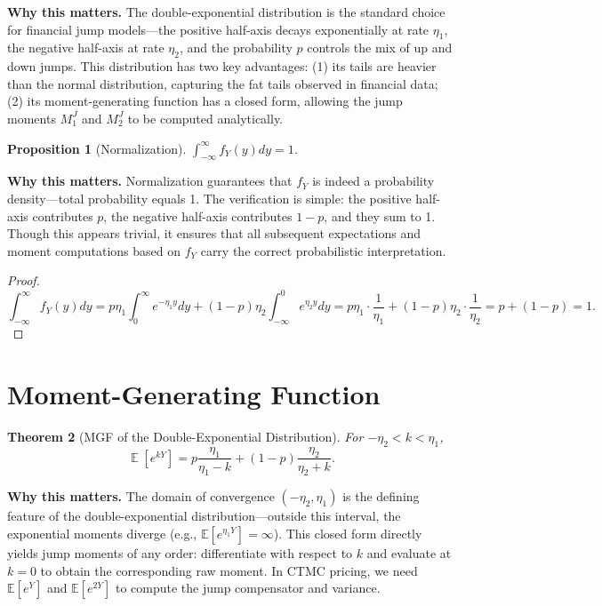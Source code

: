 \documentclass[11pt,a4paper,openany]{book}
\theoremstyle{definition}
\theoremstyle{plain}
\newtheorem{theorem}{Theorem}[chapter]
\newtheorem{proposition}[theorem]{Proposition}
\theoremstyle{remark}
\DeclareMathOperator{\E}{\mathbb{E}}
\newcommand{\1}{\mathbbm{1}}
\begin{document}
\medskip
\noindent\textbf{Why this matters.} The double-exponential distribution is the standard choice for financial jump models---the positive half-axis decays exponentially at rate $\eta_1$, the negative half-axis at rate $\eta_2$, and the probability $p$ controls the mix of up and down jumps. This distribution has two key advantages: (1) its tails are heavier than the normal distribution, capturing the fat tails observed in financial data; (2) its moment-generating function has a closed form, allowing the jump moments $M_1^J$ and $M_2^J$ to be computed analytically.

\begin{proposition}[Normalization]
$\int_{-\infty}^{\infty} f_{Y}(y) dy = 1$.
\end{proposition}

\medskip
\noindent\textbf{Why this matters.} Normalization guarantees that $f_Y$ is indeed a probability density---total probability equals 1. The verification is simple: the positive half-axis contributes $p$, the negative half-axis contributes $1-p$, and they sum to 1. Though this appears trivial, it ensures that all subsequent expectations and moment computations based on $f_Y$ carry the correct probabilistic interpretation.

\begin{proof}
\[
\int_{-\infty}^{\infty} f_{Y}(y) dy = p \eta_{1} \int_{0}^{\infty} e^{-\eta_{1} y} dy + (1-p) \eta_{2} \int_{-\infty}^{0} e^{\eta_{2} y} dy = p \eta_{1} \cdot \frac{1}{\eta_{1}} + (1-p) \eta_{2} \cdot \frac{1}{\eta_{2}} = p + (1-p) = 1.
\]
\end{proof}

\section{Moment-Generating Function}

\begin{theorem}[MGF of the Double-Exponential Distribution]
For $-\eta_{2} < k < \eta_{1}$,
\[
\boxed{\E[e^{kY}] = p \frac{\eta_{1}}{\eta_{1} - k} + (1-p) \frac{\eta_{2}}{\eta_{2} + k}}.
\]
\end{theorem}

\medskip
\noindent\textbf{Why this matters.} The domain of convergence $(-\eta_2, \eta_1)$ is the defining feature of the double-exponential distribution---outside this interval, the exponential moments diverge (e.g., $\mathbb{E}[e^{\eta_1 Y}] = \infty$). This closed form directly yields jump moments of any order: differentiate with respect to $k$ and evaluate at $k=0$ to obtain the corresponding raw moment. In CTMC pricing, we need $\mathbb{E}[e^Y]$ and $\mathbb{E}[e^{2Y}]$ to compute the jump compensator and variance.
\end{document}
